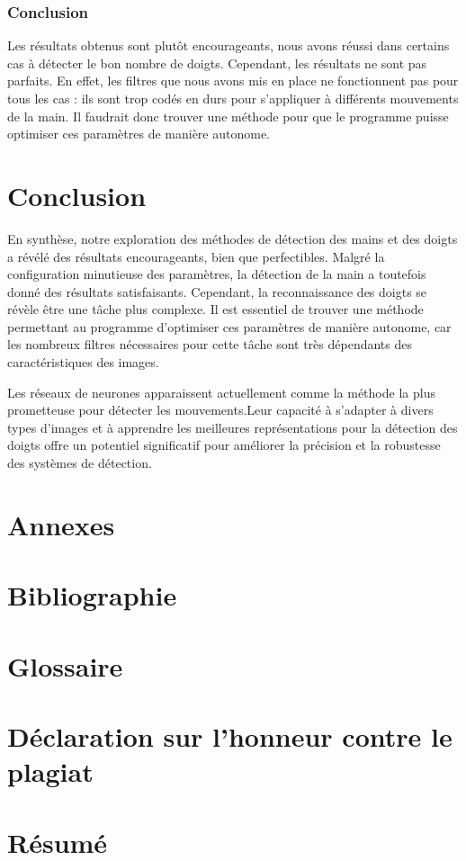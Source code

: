 \documentclass[11pt]{article}
\begin{document}
\subsubsection{Conclusion}
Les résultats obtenus sont plutôt encourageants, nous avons réussi dans certains cas à détecter le bon nombre de doigts. Cependant, les résultats ne sont pas parfaits. En effet, les filtres que nous avons mis en place ne fonctionnent pas pour tous les cas : ils sont trop codés en durs pour s'appliquer à différents mouvements de la main. Il faudrait donc trouver une méthode pour que le programme puisse optimiser ces paramètres de manière autonome.

\section*{Conclusion}
En synthèse, notre exploration des méthodes de détection des mains et des doigts a révélé des résultats encourageants, bien que perfectibles. Malgré la configuration minutieuse des paramètres, la détection de la main a toutefois donné des résultats satisfaisants. Cependant, la reconnaissance des doigts se révèle être une tâche plus complexe. Il est essentiel de trouver une méthode permettant au programme d'optimiser ces paramètres de manière autonome, car les nombreux filtres nécessaires pour cette tâche sont très dépendants des caractéristiques des images. \bigbreak

Les réseaux de neurones apparaissent actuellement comme la méthode la plus prometteuse pour détecter les mouvements.Leur capacité à s'adapter à divers types d'images et à apprendre les meilleures représentations pour la détection des doigts offre un potentiel significatif pour améliorer la précision et la robustesse des systèmes de détection. \bigbreak

\newpage

\section*{Annexes}

\section*{Bibliographie}
\printbibliography

\newpage

\section*{Glossaire}

\section*{Déclaration sur l'honneur contre le plagiat}

\newpage

\newpage
\section*{Résumé}
\end{document}
